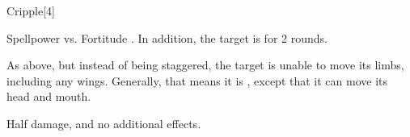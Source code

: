 \begin{spellsection}{Cripple}[4]
    \begin{spellheader}
    \end{spellheader}
    \begin{spellcontent}
        \begin{spelltargetinginfo}
        \end{spelltargetinginfo}
        \begin{spelleffects}
            \begin{spellattack}{Spellpower vs. Fortitude}
                \spellsuccess {}. In addition, the target is \staggered for 2 rounds.

                \spellcritical As above, but instead of being staggered, the target is unable to move its limbs, including any wings. Generally, that means it is \paralyzed, except that it can move its head and mouth.

                \spellfailure Half damage, and no additional effects.
            \end{spellattack}
        \end{spelleffects}
    \end{spellcontent}
    \begin{spellfooter}
        \miscastrandom
    \end{spellfooter}
    \begin{spellaugments}
    \end{spellaugments}
\end{spellsection}

